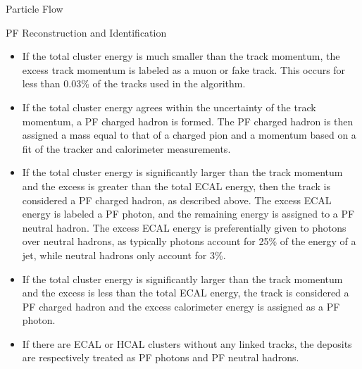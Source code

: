 \begin{section}{Particle Flow}
\begin{subsection}{PF Reconstruction and Identification}
\begin{itemize}
\item If the total cluster energy is much smaller than the track momentum, the excess track momentum is labeled as a muon or fake track.
This occurs for less than 0.03\% of the tracks used in the algorithm.
\item If the total cluster energy agrees within the uncertainty of the track momentum, a PF charged hadron is formed.
The PF charged hadron is then assigned a mass equal to that of a charged pion and a momentum based on a fit of the tracker and calorimeter measurements.
\item If the total cluster energy is significantly larger than the track momentum and the excess is greater than the total ECAL energy, then the track is considered a PF charged hadron, as described above.
The excess ECAL energy is labeled a PF photon, and the remaining energy is assigned to a PF neutral hadron.
The excess ECAL energy is preferentially given to photons over neutral hadrons, as typically photons account for 25\% of the energy of a jet, while neutral hadrons only account for 3\%.
\item If the total cluster energy is significantly larger than the track momentum and the excess is less than the total ECAL energy, the track is considered a PF charged hadron and the excess calorimeter energy is assigned as a PF photon.
\item If there are ECAL or HCAL clusters without any linked tracks, the deposits are respectively treated as PF photons and PF neutral hadrons.
\end{itemize}

\end{subsection}

\end{section}

